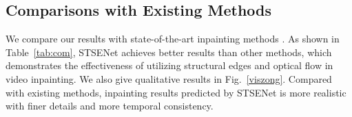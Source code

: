 \subsection{Comparisons with Existing Methods}
We compare our results with state-of-the-art inpainting methods \cite{nazeri2019edgeconnect,wang2019video,Xu_2019_CVPR,Kim_2019_CVPR1}. 
As shown in Table~\ref{tab:com}, STSENet achieves better results than other methods, which demonstrates the effectiveness of utilizing structural edges and optical flow in video inpainting.
We also give qualitative results in Fig.~\ref{viszong}. Compared with existing methods, inpainting results predicted by STSENet is more realistic with finer details and more temporal consistency.
\begin{table}[t]
	\caption{Comparisons with existing methods.}\smallskip
	
	\centering
	\label{tab:com}
\end{table}

